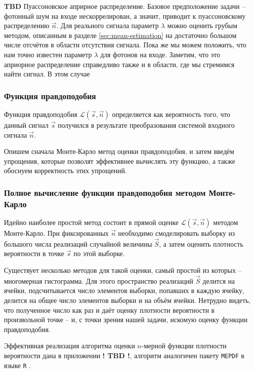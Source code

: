 \documentclass[12pt]{book}
\begin{document}
	\textbf{TBD} Пуассоновское априрное распределение. Базовое предположение задачи -- фотонный шум на входе нескоррелирован, а значит, приводит к пуассоновскому распределению $\vec{n}$. Для реального сигнала параметр $\lambda$ можно оценить грубым методом, описанным в разделе \ref{sec:mean-estimation} на достаточно большом числе отсчётов в области отсутствия сигнала. Пока же мы можем положить, что нам точно известен параметр $\lambda$ для фотонов на входе. Заметим, что это априорное распределение справедливо также и в области, где мы стремимся найти сигнал. В этом случае
	
	\subsubsection{Функция правдоподобия}
	
	Функция правдоподобия $\mathcal{L}(\vec{s}, \vec{n})$ определяется как вероятность того, что данный сигнал $\vec{s}$ получился в результате преобразования системой входного сигнала $\vec{n}$.

	Опишем сначала Монте-Карло метод оценки правдоподобия, и затем введём упрощения, которые позволят эффективнее вычислять эту функцию, а также обоснуем корректность этих упрощений.

	\subsubsection{Полное вычисление функции правдоподобия методом Монте-Карло}
	
	\label{sec:naive-monte-carlo-likelihood}

	Идейно наиболее простой метод состоит в прямой оценке $\mathcal{L}(\vec{s}, \vec{n})$ методом Монте-Карло. При фиксированных $\vec{n}$ необходимо смоделировать выборку из большого числа реализаций случайной величины $\vec{S}$, а затем оценить плотность вероятности в точке $\vec{s}$ по этой выборке.
	
	Существует несколько методов для такой оценки, самый простой из которых -- многомерная гистограмма. Для этого пространство реализаций $\vec{S}$ делится на ячейки, подсчитывается число элементов выборки, попавших в каждую ячейку, делится на общее число элементов выборки и на объём ячейки. Нетрудно видеть, что полученное число как раз и даёт оценку плотности вероятности в произвольной точке -- и, с точки зрения нашей задачи, искомую оценку функции правдоподобия.
	
	Эффективная реализация алгоритма оценки $n$-мерной функции плотности вероятности дана в приложении \textbf{! TBD !}, алгоритм аналогичен пакету \verb|MEPDF| в языке \verb|R| \cite{Wiegand2019}.
	
\end{document}
